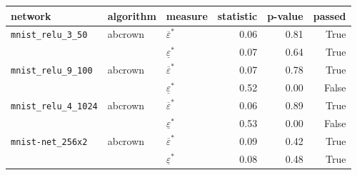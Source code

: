\begin{tabular}{lllrrr}
\toprule
network & algorithm & measure & statistic & p-value & passed \\
\midrule
\texttt{mnist\_relu\_3\_50} & abcrown & $\overline{\varepsilon}^*$ & 0.06 & 0.81 & True \\
 &  & $\underline{\varepsilon}^*$ & 0.07 & 0.64 & True \\ \hline
\texttt{mnist\_relu\_9\_100} & abcrown & $\overline{\varepsilon}^*$ & 0.07 & 0.78 & True \\
 &  & $\underline{\varepsilon}^*$ & 0.52 & 0.00 & False \\ \hline
\texttt{mnist\_relu\_4\_1024} & abcrown & $\overline{\varepsilon}^*$ & 0.06 & 0.89 & True \\
 &  & $\underline{\varepsilon}^*$ & 0.53 & 0.00 & False \\ \hline
\texttt{mnist-net\_256x2} & abcrown & $\overline{\varepsilon}^*$ & 0.09 & 0.42 & True \\
 &  & $\underline{\varepsilon}^*$ & 0.08 & 0.48 & True \\
\bottomrule
\end{tabular}
